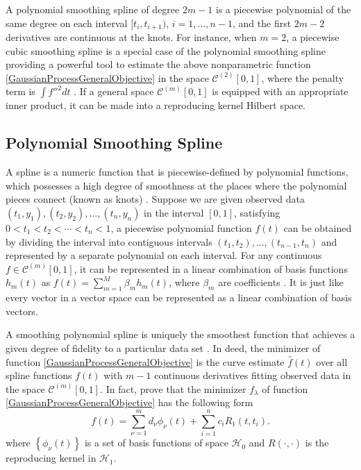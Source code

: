 A polynomial smoothing spline of degree $2m-1$ is a piecewise polynomial of the same degree on each interval $[t_i,t_{i+1})$, $i=1, \ldots, n-1$, and the first $2m-2$ derivatives are continuous at the knots. For instance, when $m=2$,  a piecewise cubic smoothing spline is a special case of the polynomial smoothing spline providing a powerful tool to estimate the above nonparametric function \eqref{GaussianProcessGeneralObjective} in the space  $\mathcal{C}^{(2)}[0,1]$, where the penalty term is $\int f''^2dt$ \citep{hastie1990generalized, wang1998smoothing}. If a general space $\mathcal{C}^{(m)}[0,1]$ is equipped with an appropriate inner product, it can be made into a reproducing kernel Hilbert space. 

\subsection{Polynomial Smoothing Spline}

A spline is a numeric function that is piecewise-defined by polynomial functions, which possesses a high degree of smoothness at the places where the polynomial pieces connect (known as knots) \citep{judd1998numerical, chen2009feedback}. Suppose we are given observed data $(t_1,y_1),(t_2,y_2), \ldots, (t_n,y_n)$ in the interval $[0,1]$, satisfying $0< t_1< t_2 < \cdots <t_n < 1$, a piecewise polynomial function $f(t)$ can be obtained by dividing the interval into contiguous intervals $(t_1,t_2),\ldots,(t_{n-1},t_n)$ and represented by a separate polynomial on each interval. For any continuous $f\in \mathcal{C}^{(m)}[0,1]$, it can be represented in a linear combination of basis functions $h_m(t)$ as $f(t) =\sum_{m=1}^{M}\beta_mh_m(t)$, where $\beta_m$ are coefficients \citep{ellis2009}. It is just like every vector in a vector space can be represented as a linear combination of basis vectors. 



A smoothing polynomial spline is uniquely the smoothest function that achieves a given degree of fidelity to a particular data set \citep{whittaker1922new}. In deed, the minimizer of function \eqref{GaussianProcessGeneralObjective} is the curve estimate $\hat{f}(t)$ over all spline functions $f(t)$ with $m-1$ continuous derivatives fitting observed data in the space $\mathcal{C}^{(m)}[0,1]$. In fact, \cite{kimeldorf1971some, kimeldorf1970correspondence}  prove that the minimizer $f_\lambda$ of function \eqref{GaussianProcessGeneralObjective} has the following form 
\begin{equation}\label{gausspriorequation}
f(t)=\sum_{\nu=1}^m d_\nu \phi_\nu(t)+\sum_{i=1}^n c_iR_1(t,t_i).
\end{equation}
where $\left\lbrace \phi_\nu(t)\right\rbrace$ is a set of basis functions of space $\mathcal{H}_0$ and $R(\cdot,\cdot)$ is the reproducing kernel in $\mathcal{H}_1$. 


